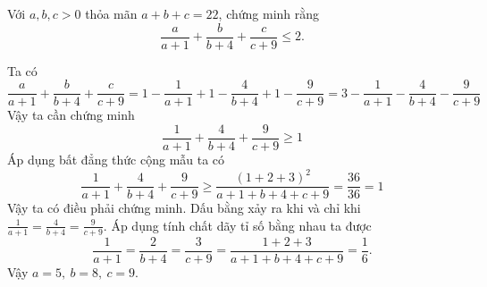 \begin{problem}
	Với $a, b, c > 0$ thỏa mãn $a + b + c = 22$, chứng minh rằng
	$$
		\frac{a}{a + 1} + \frac{b}{b + 4} + \frac{c}{c + 9} \le 2.
	$$
	\solution

	Ta có
	$$
		\frac{a}{a + 1} + \frac{b}{b + 4} + \frac{c}{c + 9} = 1 - \frac{1}{a + 1}
		+ 1 - \frac{4}{b + 4} + 1 - \frac{9}{c + 9} = 3 - \frac{1}{a + 1} - \frac{4}{b + 4}
		- \frac{9}{c + 9} 
	$$
	Vậy ta cần chứng minh 
	$$
		\frac{1}{a + 1} + \frac{4}{b + 4} + \frac{9}{c + 9} \ge 1
	$$
	Áp dụng bất đẳng thức cộng mẫu ta có
	$$
		\frac{1}{a + 1} + \frac{4}{b + 4} + \frac{9}{c + 9} \ge \frac{(1 + 2 + 3)^2}{a + 1 + b + 4 + c + 9} = \frac{36}{36} = 1
	$$
	Vậy ta có điều phải chứng minh. Dấu bằng xảy ra khi và chỉ khi $\displaystyle \frac{1}{a + 1} = \frac{4}{b + 4} = \frac{9}{c + 9}$. Áp dụng tính chất dãy tỉ số bằng nhau ta được
	$$
		\frac{1}{a + 1} = \frac{2}{b + 4} = \frac{3}{c + 9} = \frac{1 + 2 + 3}{a + 1 + b + 4 + c + 9} = 
		\frac{1}{6}.
	$$
	Vậy $a = 5,\ b = 8,\ c = 9$.
\end{problem}